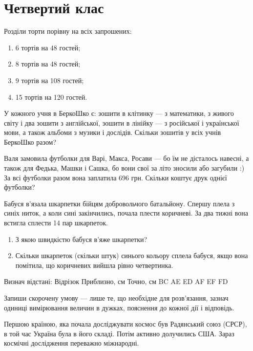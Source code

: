\chapter{Четвертий клас}

\problem
Розділи торти порівну на всіх запрошених:
\begin{enumerate}
    \item 6 тортів на 48 гостей;
    \item 8 тортів на 48 гостей;
    \item 9 тортів на 108 гостей;
    \item 15 тортів на 120 гостей.
\end{enumerate}


\problem
У кожного учня в БеркоШко є: зошити в клітинку --- з математики,
з живого світу і два зошити з англійської, зошити в лінійку --- 
з російської і української мови, а також альбоми з музики і дослідів.
Скільки зошитів у всіх учнів БеркоШко разом?


\problem
Валя замовила футболки для Варі, Макса, Росави --- бо їм не дісталось навесні,
а також для Федька, Машки і Сашка, бо вони свої за літо зносили або загубили :)
За всі футболки разом вона заплатила 696 грн.
Скільки коштує друк однієї футболки? 


\problem
Бабуся в’язала шкарпетки бійцям добровольчого батальйону.
Спершу плела з синіх ниток, а коли сині закінчились, почала плести коричневі.
За два тижні вона встигла сплести 14 пар шкарпеток.
\begin{enumerate}
    \item З якою швидкістю бабуся в’яже шкарпетки? 
    \item Скільки шкарпеток (скільки штук) синього кольору сплела бабуся,
    якщо вона помітила, що коричневих вийшла рівно четвертинка.
\end{enumerate}


\problem
Визнач відстані:
Відрізок
Приблизно, см
Точно, см
BC
AE
ED
AF
EF
FD


\problem
Запиши скорочену умову --- лише те, що необхідне для розв’язання,
зазнач одиниці вимірювання величин в дужках, пояснення до кожної дії
і відповідь.

Першою країною, яка почала досліджувати космос був Радянський союз (СРСР),
в той час Україна була в його складі. Потім активно долучились США.
Зараз космічні дослідження переважно міжнародні.

